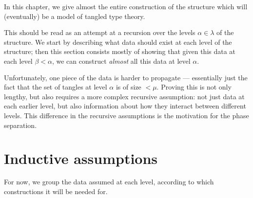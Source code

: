 In this chapter, we give almost the entire construction of the structure which will (eventually) be a model of tangled type theory.

This should be read as an attempt at a recursion over the levels $\alpha \in \lambda$ of the structure.  We start by describing what data should exist at each level of the structure; then this section consists mostly of showing that given this data at each level $\beta < \alpha$, we can construct \emph{almost} all this data at level $\alpha$.

Unfortunately, one piece of the data is harder to propagate --- essentially just the fact that the set of tangles at level $\alpha$ is of size $< \mu$.  Proving this is not only lengthy, but also requires a more complex recursive assumption: not just data at each earlier level, but also information about how they interact between different levels.  This difference in the recursive assumptions is the motivation for the phase separation.

\section{Inductive assumptions}

For now, we group the data assumed at each level, according to which constructions it will be needed for.

